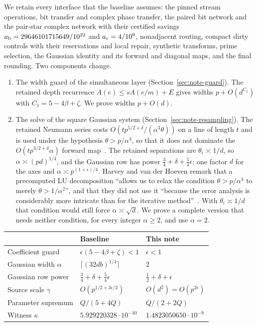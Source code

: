 \documentclass[11pt]{article}
\newcommand{\ab}{a_{\rm b}}
\newcommand{\ac}{a_{\rm c}}
\begin{document}
We retain every interface that the baseline assumes: the pinned stream
operations, bit transfer and complex phase transfer, the paired bit network
and the pair-star complex network with their certified savings
$\ab=29646101715649/10^{22}$ and $\ac=4/10^9$, nonadjacent routing,
compact dirty controls with their reservations and local repair, synthetic
transforms, prime selection, the Gaussian identity and its forward and
diagonal maps, and the final rounding. Two components change.
\begin{enumerate}
\item The width guard of the simultaneous layer (Section~\ref{sec:note-guard}).
The retained depth recurrence $A(e)\le sA(e/m)+E$ gives widths
$p+O(d^{C_1})$ with $C_1=5-4\beta+\zeta$. We prove widths $p+O(d)$.
\item The solve of the square Gaussian system
(Section~\ref{sec:note-resampling}). The retained Neumann series costs
$O(tp^{5/2+\delta}/(\alpha^3\theta))$ on a line of length $t$ and is used
under the hypothesis $\theta>p/\alpha^4$, so that it does not dominate the
$O(tp^{3/2+\delta}\alpha)$ forward map~\cite[Section~4.4.2]{HarveyHoeven2021}.
The retained separations are $\theta_i\asymp1/d$, so $\alpha\asymp(pd)^{1/4}$,
and the Gaussian row has power $\frac34+\delta+\frac54\epsilon$: one factor
$d$ for the axes and $\alpha\asymp p^{(1+\epsilon)/4}$. Harvey and van der
Hoeven remark that a precomputed LU decomposition ``allows us to relax the
condition $\theta>p/\alpha^4$ to merely $\theta>1/\alpha^2$'', and that they
did not use it ``because the error analysis is considerably more intricate
than for the iterative method''~\cite[Section~4.4.2, pp.~34--35]{HarveyHoeven2021}.
With $\theta_i\asymp1/d$ that condition would still force
$\alpha\asymp\sqrt d$. We prove a complete version that needs neither
condition, for every integer $\alpha\ge2$, and use $\alpha=2$.
\end{enumerate}

\begin{center}
\begin{tabular}{@{}lll@{}}
\toprule
& Baseline & This note\\
\midrule
Coefficient guard & $\epsilon(5-4\beta+\zeta)<1$ & $\epsilon<1$\\
Gaussian width $\alpha$ & $\lceil(32db)^{1/4}\rceil$ & $2$\\
Gaussian row power & $\frac34+\delta+\frac54\epsilon$ & $\frac12+\delta+\epsilon$\\
Source scale $\gamma$ & $O(p^{1/2+3\epsilon/2})$ & $O(d^2)=O(p^{2\epsilon})$\\
Parameter supremum & $Q/(5+4Q)$ & $Q/(2+2Q)$\\
Witness $\kappa$ & $5.929220328\cdot10^{-10}$ & $1.4823050650\cdot10^{-9}$\\
\bottomrule
\end{tabular}
\end{center}
\end{document}
